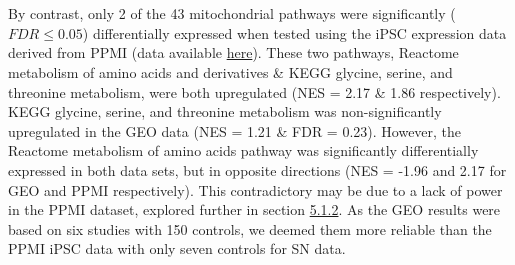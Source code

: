 \documentclass{article}
\begin{document}
\\
\\By contrast, only 2 of the 43 mitochondrial pathways were significantly ($FDR \leq 0.05$) differentially expressed when tested using the iPSC expression data derived from PPMI (data available \href{https://github.com/Thomas-brightwell/PD-MSc-project-code/blob/main/Thesis/Supplementary%20materials/PPMI_gsea_results.csv}{here}). These two pathways, Reactome metabolism of amino acids and derivatives \& KEGG glycine, serine, and threonine metabolism, were both upregulated (NES = 2.17 \& 1.86 respectively). KEGG glycine, serine, and threonine metabolism was non-significantly upregulated in the GEO data (NES = 1.21 \& FDR = 0.23). However, the Reactome metabolism of amino acids pathway was significantly differentially expressed in both data sets, but in opposite directions (NES = -1.96 and 2.17 for GEO and PPMI respectively). This contradictory may be due to a lack of power in the PPMI dataset, explored further in section \hyperref[subsubsec:GEOandPPMI]{5.1.2}. As the GEO results were based on six studies with 150 controls, we deemed them more reliable than the PPMI iPSC data with only seven controls for SN data.
\newpage
\end{document}
